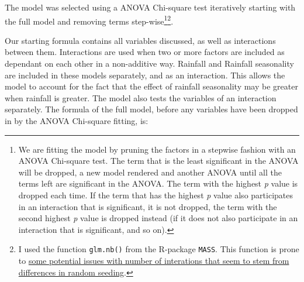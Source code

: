 \documentclass[a4paper,10pt]{article} %
\begin{document}
The model was selected using a ANOVA Chi-square test iteratively starting with the full model and removing terms step-wise\footnote{We are fitting the model by pruning the factors in a stepwise fashion with an ANOVA Chi-square test. The term that is the least significant in the ANOVA will be dropped, a new model rendered and another ANOVA until all the terms left are significant in the ANOVA. The term with the highest \emph{p} value is dropped each time. If the term that has the highest \emph{p} value also participates in an interaction that is significant, it is not dropped, the term with the second highest \emph{p} value is dropped instead (if it does not also participate in an interaction that is significant, and so on).}\footnote{I used the function \texttt{glm.nb()} from the R-package \texttt{MASS}. This function is prone to \href{https://stackoverflow.com/questions/11749977/why-does-glm-nb-throw-a-missing-value-error-only-on-very-specific-inputs}{some potential issues with number of interations that seem to stem from differences in random seeding}.}.


Our starting formula contains all variables discussed, as well as interactions between them. Interactions are used when two or more factors are included as dependant on each other in a non-additive way. Rainfall and Rainfall seasonality are included in these models separately, and as an interaction. This allows the model to account for the fact that the effect of rainfall seasonality may be greater when rainfall is greater. The model also tests the variables of an interaction separately. The formula of the full model, before any variables have been dropped in by the ANOVA Chi-square fitting, is:
\end{document}
